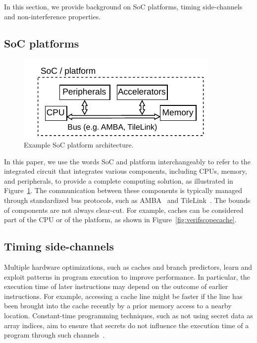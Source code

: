 In this section, we provide background on SoC platforms, timing side-channels and non-interference properties.

\subsection{SoC platforms}

\begin{figure}[t]
    \begin{center}
    \includegraphics[width=0.8\columnwidth]{figures/exampleplatform/exampleplatform.pdf}
    \end{center}
    \vspace*{-1em}
    \caption{\label{fig:exampleplatform}
        Example SoC platform architecture.
    }
    \vspace*{-1em}
\end{figure}

In this paper, we use the words SoC and platform interchangeably to refer to the integrated circuit that integrates various components, including CPUs, memory, and peripherals, to provide a complete computing solution, as illustrated in Figure~\ref{fig:exampleplatform}.
The communication between these components is typically managed through standardized bus protocols, such as AMBA~\cite{arm_amba} and TileLink~\cite{tilelink_spec}.
The bounds of components are not always clear-cut.
For example, caches can be considered part of the CPU or of the platform, as shown in Figure~\ref{fig:verifscopecache}.

\subsection{Timing side-channels}

Multiple hardware optimizations, such as caches and branch predictors, learn and exploit patterns in program execution to improve performance.
In particular, the execution time of later instructions may depend on the outcome of earlier instructions.
For example, accessing a cache line might be faster if the line has been brought into the cache recently by a prior memory access to a nearby location.
Constant-time programming techniques, such as not using secret data as array indices, aim to ensure that secrets do not influence the execution time of a program through such channels~\cite{OsvikShamirTromer2006CacheAES,AlmeidaEtAl2016CTVerif}.

